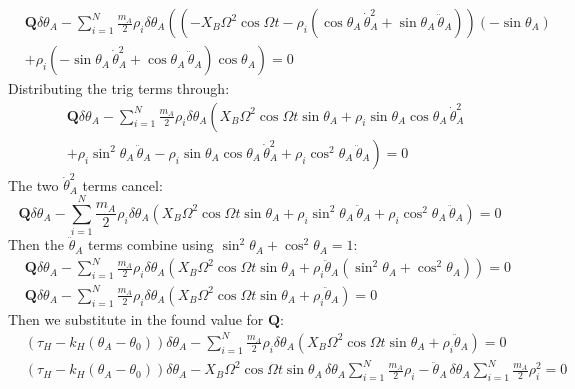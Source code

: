 \documentclass[titlepage]{article}
\begin{document}
\begin{equation}
	\begin{split}
		&\boldsymbol{Q}\delta\theta_A-\sum_{i=1}^{N}\frac{m_A}{2}\rho_i\delta\theta_A\left(\left(-X_B\Omega^2\cos\Omega t-\rho_i\left(\cos\theta_A\,\dot{\theta}_A^2+\sin\theta_A\,\ddot{\theta}_A\right)\right)\left(-\sin\theta_A\right)\right. \\
		&\left.+\rho_i\left(-\sin\theta_A\,\dot{\theta}_A^2+\cos\theta_A\,\ddot{\theta}_A\right)\cos\theta_A\right)=0
	\end{split}
\end{equation}
Distributing the trig terms through:
\begin{equation}
	\begin{split}
		&\boldsymbol{Q}\delta\theta_A-\sum_{i=1}^{N}\frac{m_A}{2}\rho_i\delta\theta_A\left(X_B\Omega^2\cos\Omega t\sin\theta_A+\rho_i\sin\theta_A\cos\theta_A\,\dot{\theta}_A^2\right. \\
		&\left.+\rho_i\sin^2\theta_A\,\ddot{\theta}_A-\rho_i\sin\theta_A\cos\theta_A\,\dot{\theta}_A^2+\rho_i\cos^2\theta_A\,\ddot{\theta}_A\right)=0
	\end{split}
\end{equation}
The two $\dot{\theta}_A^2$ terms cancel:
\begin{equation}
	\boldsymbol{Q}\delta\theta_A-\sum_{i=1}^{N}\frac{m_A}{2}\rho_i\delta\theta_A\left(X_B\Omega^2\cos\Omega t\sin\theta_A+\rho_i\sin^2\theta_A\,\ddot{\theta}_A+\rho_i\cos^2\theta_A\,\ddot{\theta}_A\right)=0
\end{equation}
Then the $\ddot{\theta}_A$ terms combine using $\sin^2\theta_A+\cos^2\theta_A=1$:
\begin{equation}
	\begin{split}
		&\boldsymbol{Q}\delta\theta_A-\sum_{i=1}^{N}\frac{m_A}{2}\rho_i\delta\theta_A\left(X_B\Omega^2\cos\Omega t\sin\theta_A+\rho_i\ddot{\theta}_A\left(\sin^2\theta_A+\cos^2\theta_A\right)\right)=0 \\
		&\boldsymbol{Q}\delta\theta_A-\sum_{i=1}^{N}\frac{m_A}{2}\rho_i\delta\theta_A\left(X_B\Omega^2\cos\Omega t\sin\theta_A+\rho_i\ddot{\theta}_A\right)=0
	\end{split}
	\label{eq:c4reduced}
\end{equation}
Then we substitute in the found value for $\boldsymbol{Q}$:
\begin{equation}
	\begin{split}
		&\left(\tau_H-k_H(\theta_A-\theta_0)\right)\delta\theta_A-\sum_{i=1}^{N}\frac{m_A}{2}\rho_i\delta\theta_A\left(X_B\Omega^2\cos\Omega t\sin\theta_A+\rho_i\ddot{\theta}_A\right)=0 \\
		&\left(\tau_H-k_H(\theta_A-\theta_0)\right)\delta\theta_A-X_B\Omega^2\cos\Omega t\sin\theta_A\,\delta\theta_A\sum_{i=1}^{N}\frac{m_A}{2}\rho_i-\ddot{\theta}_A\,\delta\theta_A\sum_{i=1}^{N}\frac{m_A}{2}\rho_i^2=0
	\end{split}
\end{equation}
\end{document}
